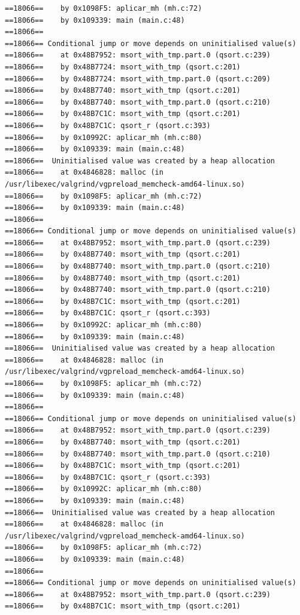 \documentclass[12pt]{article}
\begin{document}
\begin{lstlisting}[style=EstiloValgrind]
==18066==    by 0x1098F5: aplicar_mh (mh.c:72)
==18066==    by 0x109339: main (main.c:48)
==18066== 
==18066== Conditional jump or move depends on uninitialised value(s)
==18066==    at 0x48B7952: msort_with_tmp.part.0 (qsort.c:239)
==18066==    by 0x48B7724: msort_with_tmp (qsort.c:201)
==18066==    by 0x48B7724: msort_with_tmp.part.0 (qsort.c:209)
==18066==    by 0x48B7740: msort_with_tmp (qsort.c:201)
==18066==    by 0x48B7740: msort_with_tmp.part.0 (qsort.c:210)
==18066==    by 0x48B7C1C: msort_with_tmp (qsort.c:201)
==18066==    by 0x48B7C1C: qsort_r (qsort.c:393)
==18066==    by 0x10992C: aplicar_mh (mh.c:80)
==18066==    by 0x109339: main (main.c:48)
==18066==  Uninitialised value was created by a heap allocation
==18066==    at 0x4846828: malloc (in /usr/libexec/valgrind/vgpreload_memcheck-amd64-linux.so)
==18066==    by 0x1098F5: aplicar_mh (mh.c:72)
==18066==    by 0x109339: main (main.c:48)
==18066== 
==18066== Conditional jump or move depends on uninitialised value(s)
==18066==    at 0x48B7952: msort_with_tmp.part.0 (qsort.c:239)
==18066==    by 0x48B7740: msort_with_tmp (qsort.c:201)
==18066==    by 0x48B7740: msort_with_tmp.part.0 (qsort.c:210)
==18066==    by 0x48B7740: msort_with_tmp (qsort.c:201)
==18066==    by 0x48B7740: msort_with_tmp.part.0 (qsort.c:210)
==18066==    by 0x48B7C1C: msort_with_tmp (qsort.c:201)
==18066==    by 0x48B7C1C: qsort_r (qsort.c:393)
==18066==    by 0x10992C: aplicar_mh (mh.c:80)
==18066==    by 0x109339: main (main.c:48)
==18066==  Uninitialised value was created by a heap allocation
==18066==    at 0x4846828: malloc (in /usr/libexec/valgrind/vgpreload_memcheck-amd64-linux.so)
==18066==    by 0x1098F5: aplicar_mh (mh.c:72)
==18066==    by 0x109339: main (main.c:48)
==18066== 
==18066== Conditional jump or move depends on uninitialised value(s)
==18066==    at 0x48B7952: msort_with_tmp.part.0 (qsort.c:239)
==18066==    by 0x48B7740: msort_with_tmp (qsort.c:201)
==18066==    by 0x48B7740: msort_with_tmp.part.0 (qsort.c:210)
==18066==    by 0x48B7C1C: msort_with_tmp (qsort.c:201)
==18066==    by 0x48B7C1C: qsort_r (qsort.c:393)
==18066==    by 0x10992C: aplicar_mh (mh.c:80)
==18066==    by 0x109339: main (main.c:48)
==18066==  Uninitialised value was created by a heap allocation
==18066==    at 0x4846828: malloc (in /usr/libexec/valgrind/vgpreload_memcheck-amd64-linux.so)
==18066==    by 0x1098F5: aplicar_mh (mh.c:72)
==18066==    by 0x109339: main (main.c:48)
==18066== 
==18066== Conditional jump or move depends on uninitialised value(s)
==18066==    at 0x48B7952: msort_with_tmp.part.0 (qsort.c:239)
==18066==    by 0x48B7C1C: msort_with_tmp (qsort.c:201)

\end{lstlisting}
\end{document}
